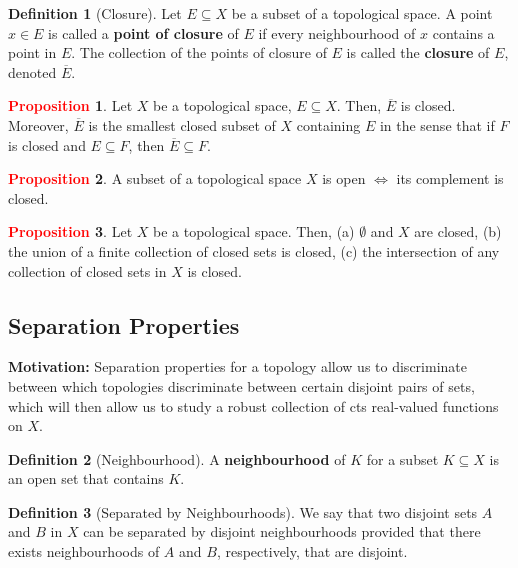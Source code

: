 \documentclass[11pt]{article}
\theoremstyle{definition}
\theoremstyle{definition}
\theoremstyle{definition}
\newtheorem{definition}{\textcolor{OliveGreen}{Definition}}
\newtheorem{prop}{\textcolor{red}{Proposition}}
\theoremstyle{remark}
\begin{document}
\begin{definition}[Closure]
	Let $E \subseteq X$ be a subset of a topological space. A point $x \in E$ is called a \textbf{point of closure} of $E$ if every neighbourhood of $x$ contains a point in $E$. The collection of the points of closure of $E$ is called the \textbf{closure} of $E$, denoted $\overline{E}$. 
\end{definition}

\begin{prop}
	Let $X$ be a topological space, $E \subseteq X$. Then, $\overline{E}$ is closed. Moreover, $\overline{E}$ is the smallest closed subset of $X$ containing $E$ in the sense that if $F$ is closed and $E \subseteq F$, then $\overline{E} \subseteq F$. 
\end{prop}

\begin{prop}
	A subset of a topological space $X$ is open $\iff$ its complement is closed. 
\end{prop}

\begin{prop}
	Let $X$ be a topological space. Then, (a) $\emptyset$ and $X$ are closed, (b) the union of a finite collection of closed sets is closed, (c) the intersection of any collection of closed sets in $X$ is closed. 
\end{prop}

\subsection{Separation Properties}
\textbf{Motivation:} Separation properties for a topology allow us to discriminate between which topologies discriminate between certain disjoint pairs of sets, which will then allow us to study a robust collection of cts real-valued functions on $X$. 

\begin{definition}[Neighbourhood]
	A \textbf{neighbourhood} of $K$ for a subset $K \subseteq X$ is an open set that contains $K$. 
\end{definition} 

\begin{definition}[Separated by Neighbourhoods]
	We say that two disjoint sets $A$ and $B$ in $X$ can be separated by disjoint neighbourhoods provided that there exists neighbourhoods of $A$ and $B$, respectively, that are disjoint. 
\end{definition}
\end{document}
